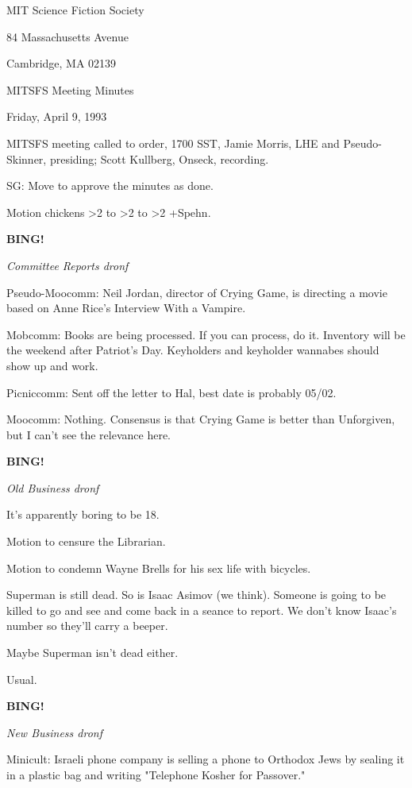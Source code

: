 \documentclass[12pt]{article}
\newcommand{\bing}{{\bf BING!} }
\newcommand{\goto}[1]{\bing \vskip 12pt \centerline{{\em{#1}}}}
\begin{document}
\begin{center}

MIT Science Fiction Society 

84 Massachusetts Avenue

Cambridge, MA 02139

\vspace{12pt}

MITSFS Meeting Minutes 

Friday, April 9, 1993

\end{center}
 
\vspace{18pt}

\setlength{\parskip}{6pt}

\noindent
MITSFS meeting called to order, 1700 SST,
Jamie Morris, LHE and Pseudo-Skinner, presiding; Scott Kullberg, Onseck, recording.

SG: Move to approve the minutes as done.

Motion chickens >2 to >2 to >2 +Spehn.

\goto{Committee Reports dronf}

Pseudo-Moocomm: Neil Jordan, director of Crying Game, is directing a movie based on Anne Rice's Interview With a Vampire.

Mobcomm: Books are being processed. If you can process, do it. Inventory will be the weekend after Patriot's Day. Keyholders and keyholder wannabes should show up and work.

Picniccomm: Sent off the letter to Hal, best date is probably 05/02.

Moocomm: Nothing. Consensus is that Crying Game is better than Unforgiven, but I can't see the relevance here.

\goto{Old Business dronf}

It's apparently boring to be 18.

Motion to censure the Librarian.

Motion to condemn Wayne Brells for his sex life with bicycles.

Superman is still dead. So is Isaac Asimov (we think). Someone is going to be killed to go and see and come back in a seance to report. We don't know Isaac's number so they'll carry a beeper.

Maybe Superman isn't dead either.

Usual.

\goto{New Business dronf}

Minicult: Israeli phone company is selling a phone to Orthodox Jews by sealing it in a plastic bag and writing "Telephone Kosher for Passover."
\end{document}
